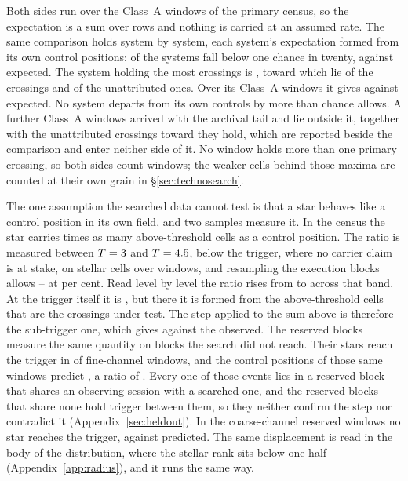 Both sides run over the \CeNWin{} Class~A windows of the primary census, so
the expectation is a sum over rows and nothing is carried at an assumed rate.
The same comparison holds system by system, each system's expectation formed
from its own control positions: \MtNSysLowP{} of the \MtNSysChance{} systems
fall below one chance in twenty, against \MtNSysLowPExp{} expected. The system
holding the most crossings is \MtTopStar, toward which lie
\MtTopStarNCross{} of the \EvNCrossRaw{} crossings and \MtTopStarNUnattr{} of
the unattributed ones. Over its \MtTopSysNWin{} Class~A windows it gives
\MtTopSysObs{} against \MtTopSysExp{} expected. No system departs from its
own controls by more than chance allows.
A further \CeNWinTail{} Class~A windows arrived with the archival tail and lie
outside it, together with the \CeNTailCrossWord{} unattributed crossings
toward \CeTailStar{} they hold, which are reported beside the comparison and
enter neither side of it. No window holds more than one primary crossing, so
both sides count windows; the weaker cells behind those maxima are counted at
their own grain in \S\ref{sec:technosearch}.

The one assumption the searched data cannot test is that a star behaves like
a control position in its own field, and two samples measure it. In the census
the star carries \CeStep{} times as many above-threshold cells as a control
position. The ratio is measured between $T=3$ and
$T=4.5$, below the trigger, where no carrier claim is at stake, on
\CeStepNStar{} stellar cells over \CeStepNWin{} windows, and resampling the
execution blocks allows \CeStepLo--\CeStepHi{} at \CeCovPct{} per cent.
Read level by level the ratio rises from \CkRatioLo{} to \CkRatioHi{}
across that band. At the trigger itself it is \CeTrAt, but there it is formed
from the \CeStepNX{} above-threshold cells that are the crossings under test.
The step applied to the sum above is therefore the sub-trigger one, which
gives \CeExpX{} against the \CeObs{} observed. The reserved blocks measure
the same quantity on blocks the search did not reach. Their stars reach the
trigger in \StHoObs{} of \StHoNFine{} fine-channel windows, and the control
positions of those same windows predict \StHoExpFine, a ratio of
\StHoRatio. Every one of those
events lies in a reserved block that shares an observing session with a
searched one, and the \HsIndBlocks{} reserved blocks that share none hold
\HsIndObsWord{} trigger \HsIndObsNoun{} between them, so they neither confirm
the step nor contradict it (Appendix~\ref{sec:heldout}). In the \StHoNCoarse{} coarse-channel
reserved windows no star reaches the trigger, against \StHoExpCoarse{}
predicted. The same displacement is read in the body of the distribution,
where the stellar rank sits below one half (Appendix~\ref{app:radius}), and it
runs the same way.


